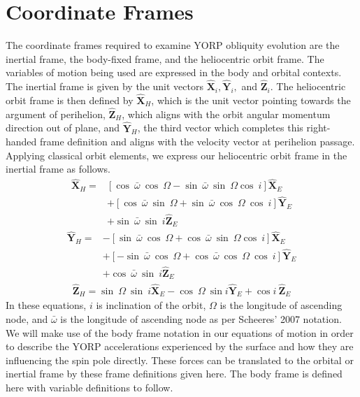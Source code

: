 \section{Coordinate Frames}\label{coord}

The coordinate frames required to examine YORP obliquity evolution are the inertial frame, the body-fixed frame, and the heliocentric orbit frame. The variables of motion being used are expressed in the body and orbital contexts. The inertial frame is given by the unit vectors $\mathbf{\hat{X}}_i, \mathbf{\hat{Y}}_i,$ and $\mathbf{\hat{Z}}_i$. The heliocentric orbit frame is then defined by $\mathbf{\hat{X}}_H$, which is the unit vector pointing towards the argument of perihelion, $\mathbf{\hat{Z}}_H$, which aligns with the orbit angular momentum direction out of plane, and $\mathbf{\hat{Y}}_H$, the third vector which completes this right-handed frame definition and aligns with the velocity vector at perihelion passage.
Applying classical orbit elements, we express our heliocentric orbit frame in the inertial frame as follows.
\begin{equation}
\begin{split}
\mathbf{\hat{X}}_H = &[\cos \: \bar{\omega} \:\cos\:\Omega - \sin \:\bar{\omega}\:\sin\:\Omega \cos \:i] \mathbf{\hat{X}}_E \\
& + [\cos\:\bar{\omega}\:\sin\:\Omega + \sin\:\bar{\omega}\:\cos\:\Omega \:\cos\: i] \mathbf{\hat{Y}}_E \\
& + \sin\: \bar{\omega} \:\sin \:i \mathbf{\hat{Z}}_E
\end{split}
\end{equation}
\begin{equation}
\begin{split}
\mathbf{\hat{Y}}_H = &-[\sin \: \bar{\omega} \:\cos\:\Omega + \cos \:\bar{\omega}\:\sin\:\Omega \cos \:i] \mathbf{\hat{X}}_E \\
& + [-\sin\:\bar{\omega}\:\cos\:\Omega + \cos\:\bar{\omega}\:\cos\:\Omega \:\cos\: i] \mathbf{\hat{Y}}_E \\
& + \cos\: \bar{\omega} \:\sin \:i \mathbf{\hat{Z}}_E
\end{split}
\end{equation}
\begin{equation}
\begin{split}
\mathbf{\hat{Z}}_H = \sin \: \Omega \: \sin\: i \mathbf{\hat{X}}_E - \cos \: \Omega\: \sin i \mathbf{\hat{Y}}_E + \cos i \:\mathbf{\hat{Z}}_E
\end{split}
\end{equation}
In these equations, $i$ is inclination of the orbit, $\Omega$ is the longitude of ascending node, and $\bar{\omega}$ is the longitude of ascending node as per Scheeres' 2007 notation. We will make use of the body frame notation in our equations of motion in order to describe the YORP accelerations experienced by the surface and how they are influencing the spin pole directly. These forces can be translated to the orbital or inertial frame by these frame definitions given here. The body frame is defined here with variable definitions to follow.


